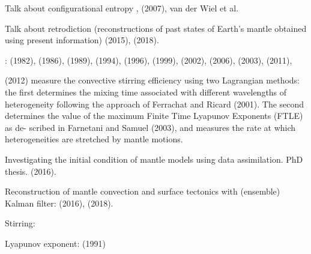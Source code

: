 Talk about configurational entropy , (2007), van der Wiel et al.

Talk about retrodiction (reconstructions of past states of Earth's mantle obtained using present information)
\textcite{cobs15} (2015),
\textcite{cogb18} (2018).

\Literature: 
\textcite{ridn82} (1982),
\textcite{gurn86} (1986),
\textcite{chri89} (1989),
\textcite{scha94} (1994),
\textcite{schh96} (1996),
\textcite{vazh99} (1999),
\textcite{falt02} (2002),
\textcite{cosc06} (2006),
\textcite{fasa03} (2003),
\textcite{saad11} (2011),

\textcite{sato12} (2012) measure the convective stirring efficiency using two Lagrangian methods: 
the first determines the mixing time associated with
different wavelengths of heterogeneity following the approach of
Ferrachat and Ricard (2001). The second determines the value of
the maximum Finite Time Lyapunov Exponents (FTLE) as de-
scribed in Farnetani and Samuel (2003), and measures the rate at
which heterogeneities are stretched by mantle motions.

Investigating the initial condition
of mantle models using data assimilation. PhD thesis. \textcite{pric16} (2016).

Reconstruction of mantle convection and surface tectonics with (ensemble) Kalman filter:
 (2016),
 (2018).

Stirring:  

Lyapunov exponent: \textcite{pier91} (1991)

